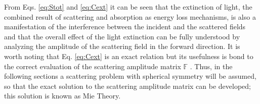 %
%
\noindent From Eqs. \eqref{eq:Stot} and  \eqref{eq:Cext} it can be seen that the extinction of light, the combined result of scattering and absorption as energy loss mechanisms, is also a manifestation of the interference between the incident and the scattered fields and that the overall effect of the light extinction can be fully understood by analyzing the  amplitude of the scattering field in the forward direction.  It is worth noting that Eq. \eqref{eq:Cext} is an exact relation but its usefulness is bond to the correct evaluation of the scattering amplitude matrix $\mathbb{F}$ \cite{tsang_scattering_2000}. Thus, in the following sections a scattering problem with spherical symmetry will be assumed, so that the exact solution to the scattering amplitude matrix can be developed; this solution is known as Mie Theory.



